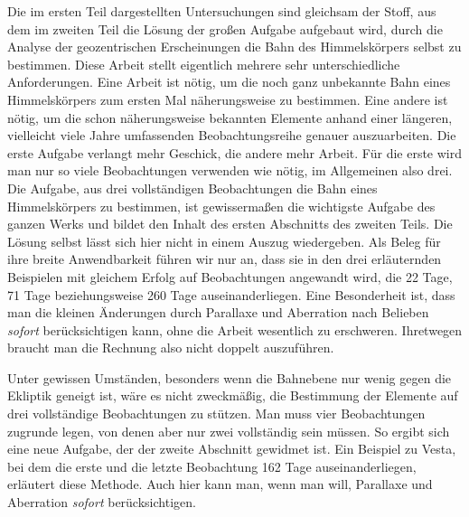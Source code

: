 Die im ersten Teil dargestellten Untersuchungen sind gleichsam der Stoff, aus dem im zweiten Teil die Lösung der großen Aufgabe aufgebaut wird, durch die Analyse der geozentrischen Erscheinungen die Bahn des Himmelskörpers selbst zu bestimmen. Diese Arbeit stellt eigentlich mehrere sehr unterschiedliche Anforderungen. Eine Arbeit ist nötig, um die noch ganz unbekannte Bahn eines Himmelskörpers zum ersten Mal näherungsweise zu bestimmen. Eine andere ist nötig, um die schon näherungsweise bekannten Elemente anhand einer längeren, vielleicht viele Jahre umfassenden Beobachtungsreihe genauer auszuarbeiten. Die erste Aufgabe verlangt mehr Geschick, die andere mehr Arbeit. Für die erste wird man nur so viele Beobachtungen verwenden wie nötig, im Allgemeinen also drei. Die Aufgabe, aus drei vollständigen Beobachtungen die Bahn eines Himmelskörpers zu bestimmen, ist gewissermaßen die wichtigste Aufgabe
des ganzen Werks und bildet den Inhalt des ersten Abschnitts des zweiten Teils. Die Lösung selbst lässt sich hier nicht in einem Auszug wiedergeben. Als Beleg für ihre breite Anwendbarkeit führen wir nur an, dass sie in den drei erläuternden Beispielen mit gleichem Erfolg auf Beobachtungen angewandt wird, die 22 Tage, 71 Tage beziehungsweise 260 Tage auseinanderliegen. Eine Besonderheit ist, dass man die kleinen Änderungen durch Parallaxe und Aberration nach Belieben \textit{sofort} berücksichtigen kann, ohne die Arbeit wesentlich zu erschweren. Ihretwegen braucht man die Rechnung also nicht doppelt auszuführen.

Unter gewissen Umständen, besonders wenn die Bahnebene nur wenig gegen die Ekliptik geneigt ist, wäre es nicht zweckmäßig, die Bestimmung der Elemente auf drei vollständige Beobachtungen zu stützen. Man muss vier Beobachtungen zugrunde legen, von denen aber nur zwei vollständig sein müssen. So ergibt sich eine neue Aufgabe, der der zweite Abschnitt gewidmet ist. Ein Beispiel zu Vesta, bei dem die erste und die letzte Beobachtung 162 Tage auseinanderliegen, erläutert diese Methode. Auch hier kann man, wenn man will, Parallaxe und Aberration \textit{sofort} berücksichtigen.

